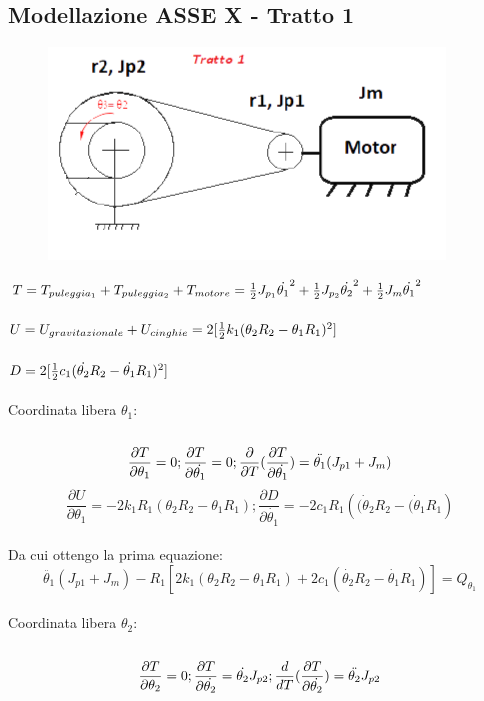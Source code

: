 \documentclass{article}
\begin{document}
\subsection{Modellazione ASSE X - Tratto 1} 
\begin{figure}[H]
\centering
\includegraphics[width=.6\textwidth]{./assex/tratto1.png}
\end{figure}
$T = T_{puleggia_1} + T_{puleggia_2}+ T_{motore}
= {1 \over 2}J_{p_1}\dot{\theta_{1}}^{2}+ {1 \over 2}J_{p_2}\dot{\theta_{2}}^{2} + {1 \over 2}J_{m}\dot{\theta_{1}}^{2}$
\\
\\
$U = U_{gravitazionale} + U_{cinghie}
=  2[ {1 \over 2}k _{1}(\theta_{2}R_{2}-\theta_{1}R_{1})^{2} ]$
\\
\\
$D = 2[ {1 \over 2}c _{1}(\dot{\theta_{2}} R_{2}-\dot{\theta_{1}}R_{1})^{2} ]$
\\
\\
Coordinata libera $\theta_{1}$:
\\
\\

\begin{equation*}
{ \partial T \over \partial \theta_{1}} = 0 ; { \partial T \over \partial   \dot{\theta_{1}} } = 0;  \frac{\partial }{\partial T}(\frac{\partial T}{\partial \dot{\theta_{1}}})  = \ddot{\theta_{1}}(J_{p1} + J_{m})
\end{equation*} 
\begin{equation*}
\frac{\partial U}{\partial \theta_{1}} = -2k_{1}R_{1}(\theta_{2}R_{2} - \theta_{1}R_{1});
\frac{\partial D}{\partial \dot{\theta_{1}}} = -2c_{1}R_{1}(\dot{(\theta_{2}}R_{2} - \dot{(\theta_{1}}R_{1})
\end{equation*}
\\
Da cui ottengo la prima equazione: 
\\
\begin{equation*}
 \ddot{\theta_{1}}(J_{p1}+J_{m}) - R_{1}[2k_{1}(\theta_{2}R_{2}-\theta_{1}R_{1})+ 2c_{1}(\dot{\theta_{2}}R_{2}-\dot{\theta_{1}}R_{1})] = Q_{\theta_1}
\end{equation*}
\\
Coordinata libera $\theta_{2}$:
\\
\\
\begin{equation*}
{ \partial T \over \partial \theta_{2}} = 0 ; { \partial T \over \partial   \dot{\theta_{2}} } = \dot{\theta_{2}}J_{p2};  \frac{d}{dT}(\frac{\partial T}{\partial \dot{\theta_{2}}})  = \ddot{\theta_{2}}J_{p2}
\end{equation*}
\end{document}
